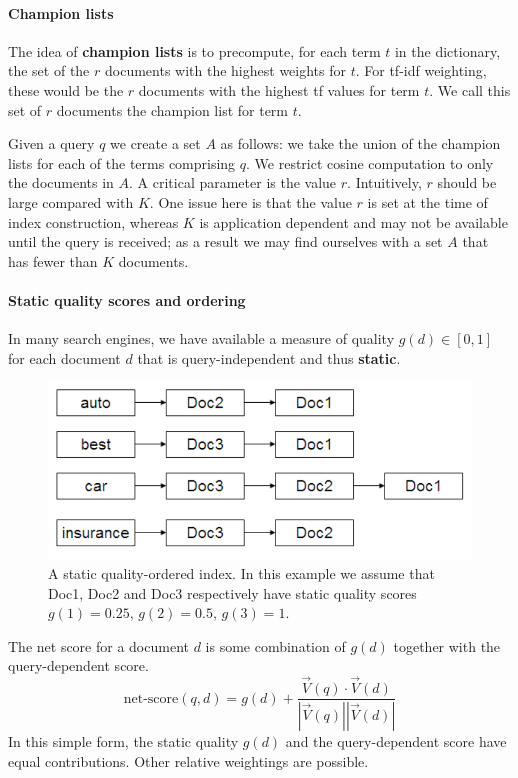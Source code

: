 \documentclass[letterpaper,11pt]{article}
\begin{document}
\paragraph{Champion lists}
The idea of \textbf{champion lists} is to precompute, for each term $t$ in the dictionary, the set of the $r$ documents with the highest weights for $t$. For tf-idf weighting, these would be the $r$ documents with the highest tf values for term $t$. We call this set of $r$ documents the champion list for term $t$.

Given a query $q$ we create a set $A$ as follows: we take the union of the champion lists for each of the terms comprising $q$. We restrict cosine computation to only the documents in $A$. A critical parameter is the value $r$. Intuitively, $r$ should be large compared with $K$. One issue here is that the value $r$ is set at the time of index construction, whereas $K$ is application dependent and may not be available until the query is received; as a result we may find ourselves with a set $A$ that has fewer than $K$ documents.

\paragraph{Static quality scores and ordering}
In many search engines, we have available a measure of quality $g(d) \in [0, 1]$ for each document $d$ that is query-independent and thus \textbf{static}.
\begin{figure}[H]
    \centering
    \includegraphics[scale=0.40]{sect7/figure_7_2.png}
    \caption{A static quality-ordered index. In this example we assume that Doc1, Doc2 and Doc3 respectively have static quality scores $g(1) = 0.25$, $g(2) = 0.5$, $g(3) = 1$.}
\end{figure}

The net score for a document $d$ is some combination of $g(d)$ together with the query-dependent score.
\[
\textrm{net-score}(q,d) = g(d) + \frac{\vec{V}(q) \cdot \vec{V}(d)}{|\vec{V}(q)| |\vec{V}(d)|}
\]
In this simple form, the static quality $g(d)$ and the query-dependent score have equal contributions. Other relative weightings are possible.
\end{document}
